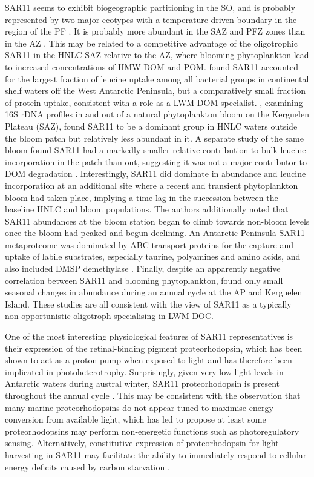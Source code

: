 SAR11 seems to exhibit biogeographic partitioning in the \ac{SO}, and is probably represented by two major ecotypes with a temperature-driven boundary in the region of the \ac{PF} \cite{Brown:2012gna}.
It is probably more abundant in the \ac{SAZ} and \ac{PFZ} zones than in the \ac{AZ} \cite{Giebel:2009hr,Ghiglione:2011ee}.
This may be related to a competitive advantage of the oligotrophic SAR11 in the \ac{HNLC} \ac{SAZ} relative to the \ac{AZ}, where blooming phytoplankton lead to increased concentrations of \ac{HMW} \ac{DOM} and \ac{POM}.
\citet{Straza:2010io} found SAR11 accounted for the largest fraction of leucine uptake among all bacterial groups in continental shelf waters off the West Antarctic Peninsula, but a comparatively small fraction of protein uptake, consistent with a role as a \ac{LWM} \ac{DOM} specialist.
\citet{West:2008kc}, examining 16S rDNA profiles in and out of a natural phytoplankton bloom on the Kerguelen Plateau (\ac{SAZ}), found SAR11 to be a dominant group in \ac{HNLC} waters outside the bloom patch but relatively less abundant in it.
A separate study of the same bloom found SAR11 had a markedly smaller relative contribution to bulk leucine incorporation in the patch than out, suggesting it was not a major contributor to \ac{DOM} degradation \cite{Obernosterer:2011df}.
Interestingly, SAR11 did dominate in abundance and leucine incorporation at an additional site where a recent and transient phytoplankton bloom had taken place, implying a time lag in the succession between the baseline \ac{HNLC} and bloom populations.
The authors additionally noted that SAR11 abundances at the bloom station began to climb towards non-bloom levels once the bloom had peaked and begun declining.
An Antarctic Peninsula SAR11 metaproteome was dominated by ABC transport proteins for the capture and uptake of labile substrates, especially taurine, polyamines and amino acids, and also included \ac{DMSP} demethylase \cite{Williams:2012bs}.
Finally, despite an apparently negative correlation between SAR11 and blooming phytoplankton, \citet{Ghiglione:2011ee} found only small seasonal changes in abundance during an annual cycle at the \ac{AP} and Kerguelen Island.
These studies are all consistent with the view of SAR11 as a typically non-opportunistic oligotroph specialising in \ac{LWM} \ac{DOC}.

One of the most interesting physiological features of SAR11 representatives is their expression of the retinal-binding pigment proteorhodopsin, which has been shown to act as a proton pump when exposed to light \cite{Anonymous:2012ck} and has therefore been implicated in photoheterotrophy.
Surprisingly, given very low light levels in Antarctic waters during austral winter, SAR11 proteorhodopsin is present throughout the annual cycle \cite{Williams:2012bs}.
This may be consistent with the observation that many marine proteorhodopsins do not appear tuned to maximise energy conversion from available light, which has led \citet{Fuhrman:2008he} to propose at least some proteorhodopsins may perform non-energetic functions such as photoregulatory sensing.
Alternatively, constitutive expression of proteorhodopsin for light harvesting in SAR11 may facilitate the ability to immediately respond to cellular energy deficits caused by carbon starvation \cite{Steindler:2011hk}.

